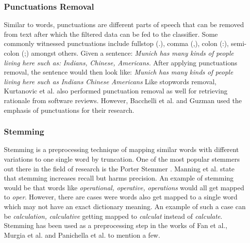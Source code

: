 \documentclass[a4paper,12pt,twoside]{report}
\begin{document}
\subsubsection{Punctuations Removal}
Similar to words, punctuations are different parts of speech that can be removed from text after which the filtered data can be fed to the classifier. Some commonly witnessed punctuations include fullstop (.), comma (,), colon (:), semi-colon (;) amongst others. 
\newline \newline
Given a sentence: \textit{Munich has many kinds of people living here such as: Indians, Chinese, Americans.}
\newline \newline
After applying punctuations removal, the sentence would then look like: \textit{Munich has many kinds of people living here such as Indians Chinese Americans}
\newline \newline
Like stopwords removal, Kurtanovic et al.\cite{Kurtanovic2017} also performed punctuation removal as well for retrieving rationale from software reviews. However, Bacchelli et al.\cite{Bacchelli2012} and Guzman\cite{Guzman2015} used the emphasis of punctuations for their research. 

\subsubsection{Stemming}
Stemming is a preprocessing technique of mapping similar words with different variations to one single word by truncation. One of the most popular stemmers out there in the field of research is the Porter Stemmer \cite{Porter}. Manning et al.\cite{Manning2009} state that stemming increases recall but harms precision. An example of stemming would be that words like \textit{operational, operative, operations} would all get mapped to \textit{oper}. However, there are cases were words also get mapped to a single word which may not have an exact dictionary meaning. An example of such a case can be \textit{calculation, calculative} getting mapped to \textit{calculat} instead of \textit{calculate}\cite{Toman2006}. Stemming has been used as a preprocessing step in the works of Fan et al.\cite{Fan2017}, Murgia et al.\cite{Murgia2016} and Panichella et al.\cite{Panichella2014} to mention a few.
\end{document}
